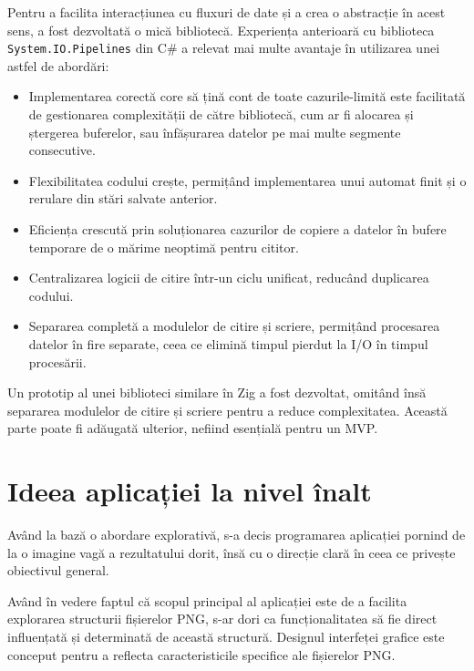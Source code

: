 \documentclass[a4paper,12pt]{report}
\begin{document}
Pentru a facilita interacțiunea cu fluxuri de date și a crea o abstracție în acest sens,
a fost dezvoltată o mică bibliotecă.
Experiența anterioară cu biblioteca \texttt{System.IO.Pipelines}\cite{system_io_pipelines}
din C\# a relevat mai multe avantaje în utilizarea unei astfel de abordări:
\begin{itemize}
  \item
  Implementarea corectă core să țină cont de toate cazurile-limită
  este facilitată de gestionarea complexității de către
  bibliotecă, cum ar fi alocarea și ștergerea buferelor,
  sau înfășurarea datelor pe mai multe segmente consecutive.

  \item
  Flexibilitatea codului crește, permițând implementarea unui automat finit
  și o rerulare din stări salvate anterior.

  \item
  Eficiența crescută prin soluționarea cazurilor de copiere a datelor în bufere temporare
  de o mărime neoptimă pentru cititor.

  \item
  Centralizarea logicii de citire într-un ciclu unificat,
  reducând duplicarea codului.

  \item
  Separarea completă a modulelor de citire și scriere,
  permițând procesarea datelor în fire separate,
  ceea ce elimină timpul pierdut la \ac{I/O} în timpul procesării.
\end{itemize}

Un prototip al unei biblioteci similare în Zig a fost dezvoltat,
omitând însă separarea modulelor de citire și scriere pentru a reduce complexitatea.
Această parte poate fi adăugată ulterior, nefiind esențială pentru un \ac{MVP}.

\section{Ideea aplicației la nivel înalt}

Având la bază o abordare explorativă, s-a decis programarea aplicației
pornind de la o imagine vagă a rezultatului dorit,
însă cu o direcție clară în ceea ce privește obiectivul general.

Având în vedere faptul că scopul principal al aplicației
este de a facilita explorarea structurii fișierelor \ac{PNG},
s-ar dori ca funcționalitatea să fie direct
influențată și determinată de această structură.
Designul interfeței grafice este conceput pentru a reflecta
caracteristicile specifice ale fișierelor \ac{PNG}.
\end{document}

